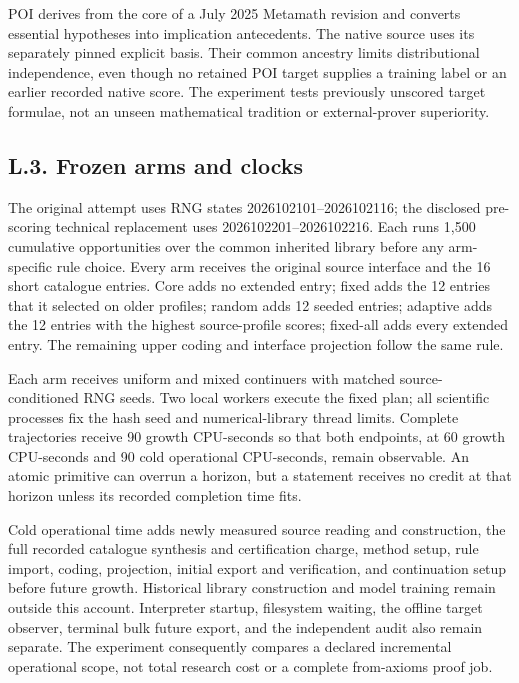 \documentclass[pdflatex,sn-basic,Numbered]{sn-jnl}
\begin{document}
POI derives from the core of a July 2025 Metamath revision and converts essential hypotheses into implication antecedents. The native source uses its separately pinned explicit basis. Their common ancestry limits distributional independence, even though no retained POI target supplies a training label or an earlier recorded native score. The experiment tests previously unscored target formulae, not an unseen mathematical tradition or external-prover superiority.

\subsection*{L.3. Frozen arms and clocks}\label{l.3.-frozen-arms-and-clocks}

The original attempt uses RNG states 2026102101--2026102116; the disclosed pre-scoring technical replacement uses 2026102201--2026102216. Each runs 1,500 cumulative opportunities over the common inherited library before any arm-specific rule choice. Every arm receives the original source interface and the 16 short catalogue entries. Core adds no extended entry; fixed adds the 12 entries that it selected on older profiles; random adds 12 seeded entries; adaptive adds the 12 entries with the highest source-profile scores; fixed-all adds every extended entry. The remaining upper coding and interface projection follow the same rule.

Each arm receives uniform and mixed continuers with matched source-conditioned RNG seeds. Two local workers execute the fixed plan; all scientific processes fix the hash seed and numerical-library thread limits. Complete trajectories receive 90 growth CPU-seconds so that both endpoints, at 60 growth CPU-seconds and 90 cold operational CPU-seconds, remain observable. An atomic primitive can overrun a horizon, but a statement receives no credit at that horizon unless its recorded completion time fits.

Cold operational time adds newly measured source reading and construction, the full recorded catalogue synthesis and certification charge, method setup, rule import, coding, projection, initial export and verification, and continuation setup before future growth. Historical library construction and model training remain outside this account. Interpreter startup, filesystem waiting, the offline target observer, terminal bulk future export, and the independent audit also remain separate. The experiment consequently compares a declared incremental operational scope, not total research cost or a complete from-axioms proof job.
\end{document}
